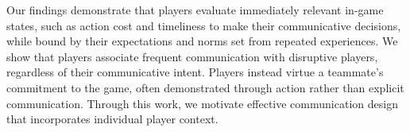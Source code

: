 Our findings demonstrate that players evaluate immediately relevant in-game states, such as action cost and timeliness to make their communicative decisions, while bound by their expectations and norms set from repeated experiences. We show that players associate frequent communication with disruptive players, regardless of their communicative intent. Players instead virtue a teammate's commitment to the game, often demonstrated through action rather than explicit communication. Through this work, we motivate effective communication design that incorporates individual player context.



